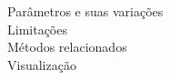 \begin{description}
\item[Parâmetros e suas variações]
\item[Limitações]
\item[Métodos relacionados]
\item[Visualização]
\end{description}
%
%
%
%
%
%
